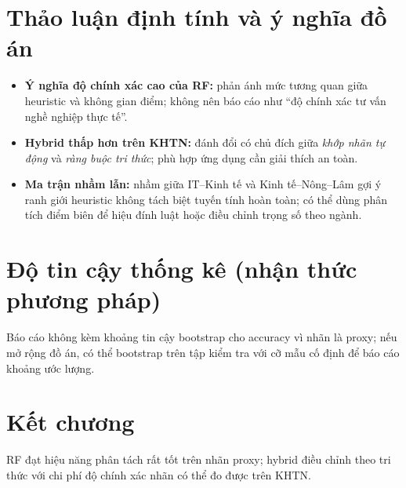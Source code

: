 \section{Thảo luận định tính và ý nghĩa đồ án}
\begin{itemize}[leftmargin=*]
  \item \textbf{Ý nghĩa độ chính xác cao của RF:} phản ánh mức tương quan giữa heuristic và không gian điểm; không nên báo cáo như ``độ chính xác tư vấn nghề nghiệp thực tế''.
  \item \textbf{Hybrid thấp hơn trên KHTN:} đánh đổi có chủ đích giữa \textit{khớp nhãn tự động} và \textit{ràng buộc tri thức}; phù hợp ứng dụng cần giải thích an toàn.
  \item \textbf{Ma trận nhầm lẫn:} nhầm giữa IT--Kinh tế và Kinh tế--Nông--Lâm gợi ý ranh giới heuristic không tách biệt tuyến tính hoàn toàn; có thể dùng phân tích điểm biên để hiệu đính luật hoặc điều chỉnh trọng số theo ngành.
\end{itemize}

\section{Độ tin cậy thống kê (nhận thức phương pháp)}
Báo cáo không kèm khoảng tin cậy bootstrap cho accuracy vì nhãn là proxy; nếu mở rộng đồ án, có thể bootstrap trên tập kiểm tra với cỡ mẫu cố định để báo cáo khoảng ước lượng.

\section{Kết chương}
RF đạt hiệu năng phân tách rất tốt trên nhãn proxy; hybrid điều chỉnh theo tri thức với chi phí độ chính xác nhãn có thể đo được trên KHTN.
